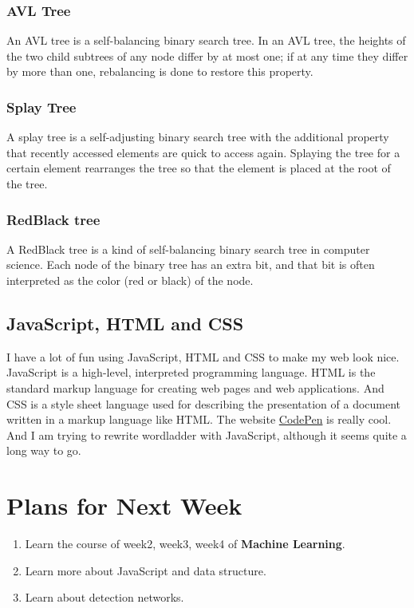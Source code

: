 \documentclass{article}
\begin{document}
\subsubsection{AVL Tree}
An AVL tree is a self-balancing binary search tree. In an AVL tree, the heights of the two child subtrees of any node differ by at most one; if at any time they differ by more than one, rebalancing is done to restore this property.

\subsubsection{Splay Tree}
A splay tree is a self-adjusting binary search tree with the additional property that recently accessed elements are quick to access again. Splaying the tree for a certain element rearranges the tree so that the element is placed at the root of the tree.

\subsubsection{RedBlack tree}
A RedBlack tree is a kind of self-balancing binary search tree in computer science. Each node of the binary tree has an extra bit, and that bit is often interpreted as the color (red or black) of the node.

\subsection{JavaScript, HTML and CSS}
I have a lot of fun using JavaScript, HTML and CSS to make my web look nice. JavaScript is a high-level, interpreted programming language. HTML is the standard markup language for creating web pages and web applications. And CSS is a style sheet language used for describing the presentation of a document written in a markup language like HTML. The website \href{https://codepen.io/#}{CodePen} is really cool. And I am trying to rewrite wordladder with JavaScript, although it seems quite a long way to go.

\section{Plans for Next Week}
\begin{enumerate}
  \item Learn the course of week2, week3, week4 of \textbf{Machine Learning}.
  \item Learn more about JavaScript and data structure.
  \item Learn about detection networks.
\end{enumerate}
\end{document}
